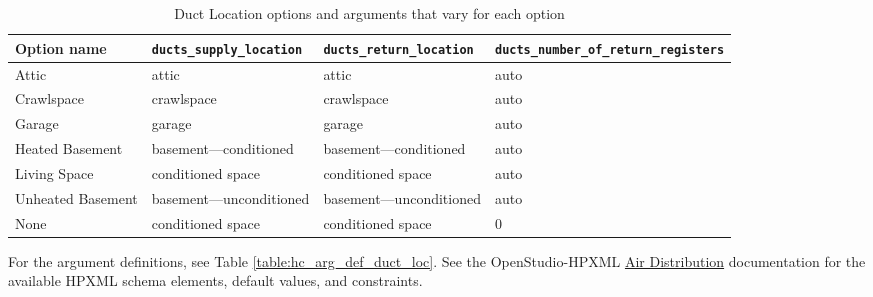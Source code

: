 \begin{longtable}[]{|p{3cm}|p{3.75cm}|p{3.75cm}|p{2.5cm}|}\caption{Duct Location options and arguments that vary for each option} \label{table:hc_opt_duct_loc} \\
\toprule\noalign{}
Option name & \texttt{ducts\_supply\_location} &
\texttt{ducts\_return\_location}  &\texttt{ducts\_number\_of\_return\_registers}
 \\
\midrule\noalign{}
\endhead
\bottomrule\noalign{}
\endlastfoot
Attic & attic &  attic & auto \\
Crawlspace & crawlspace &  crawlspace & auto\\
Garage & garage &  garage & auto\\
Heated Basement & basement---conditioned & basement---conditioned& auto\\
Living Space & conditioned space & conditioned
space  & auto\\
Unheated Basement & basement---unconditioned &
basement---unconditioned & auto \\
None & conditioned space & conditioned space & 0 \\

\end{longtable}

For the argument definitions, see Table \ref{table:hc_arg_def_duct_loc}. See the OpenStudio-HPXML \href{https://openstudio-hpxml.readthedocs.io/en/v1.8.1/workflow_inputs.html#hpxml-air-distribtuion}{Air Distribution} documentation for the available HPXML schema elements, default values, and constraints.

